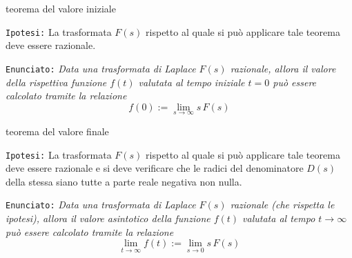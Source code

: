 		\begin{teorema}{teorema del valore iniziale} \label{teor:valiniziale}
			
			\texttt{Ipotesi:} La trasformata $F(s)$ rispetto al quale si può applicare tale teorema deve essere razionale. \vspace{3mm}
			
			\texttt{Enunciato:} \textit{Data una trasformata di Laplace $F(s)$ razionale, allora il valore della rispettiva funzione $f(t)$ valutata al tempo iniziale $t = 0$ può essere calcolato tramite la relazione}
			\begin{equation}
				f(0) := \lim_{s\rightarrow \infty} s\,F(s)
			\end{equation}
		\end{teorema}
	
		\begin{teorema}{teorema del valore finale} \label{teor:valfinale}
		
			\texttt{Ipotesi:} La trasformata $F(s)$ rispetto al quale si può applicare tale teorema deve essere razionale e si deve verificare che le radici del denominatore $D(s)$ della stessa siano tutte a parte reale negativa non nulla. \vspace{3mm}
			
			\texttt{Enunciato:} \textit{Data una trasformata di Laplace $F(s)$ razionale (che rispetta le ipotesi), allora il valore asintotico della funzione $f(t)$ valutata al tempo $t\rightarrow \infty$ può essere calcolato tramite la relazione}
			\begin{equation}
				\lim_{t\rightarrow \infty}f(t) := \lim_{s\rightarrow 0} s\,F(s)
			\end{equation}
		\end{teorema}
				


